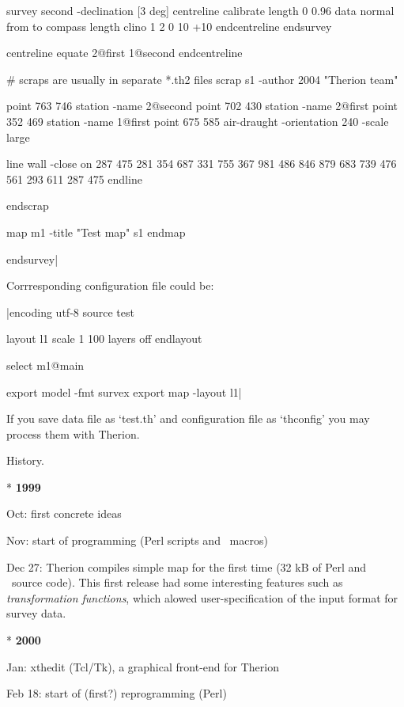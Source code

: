   survey second -declination [3 deg]
    centreline
      calibrate length 0 0.96
      data normal from to compass length clino
                  1    2  0       10     +10
    endcentreline
  endsurvey
 
  centreline
    equate 2@first 1@second
  endcentreline
 
  # scraps are usually in separate *.th2 files
  scrap s1 -author 2004 "Therion team"

    point 763 746 station -name 2@second
    point 702 430 station -name 2@first
    point 352 469 station -name 1@first
    point 675 585 air-draught -orientation 240 -scale large

    line wall -close on
      287 475
      281 354 687 331 755 367
      981 486 846 879 683 739
      476 561 293 611 287 475
    endline

  endscrap

  map m1 -title "Test map"
    s1
  endmap
 
endsurvey|

Corrresponding configuration file could be:

|encoding  utf-8
source test

layout l1
  scale 1 100
  layers off
endlayout

select m1@main

export model -fmt survex
export map -layout l1|

If you save data file as `test.th' and configuration file as `thconfig' you may 
process them with Therion.



%

\subchapter History.

\list
{}
* {\bf 1999}

  Oct: first concrete ideas

  Nov: start of programming (Perl scripts and \MP\ macros)

  Dec 27: Therion compiles simple map for the first time (32 kB of Perl and 
       \MP\ source code). This first release had some interesting features
       such as {\it transformation functions}, which alowed user-specification
       of the input format for survey data.
				
* {\bf 2000}\nobreak\par\nobreak
  Jan: xthedit (Tcl/Tk), a graphical front-end for Therion

  Feb 18: start of (first?) reprogramming (Perl)

